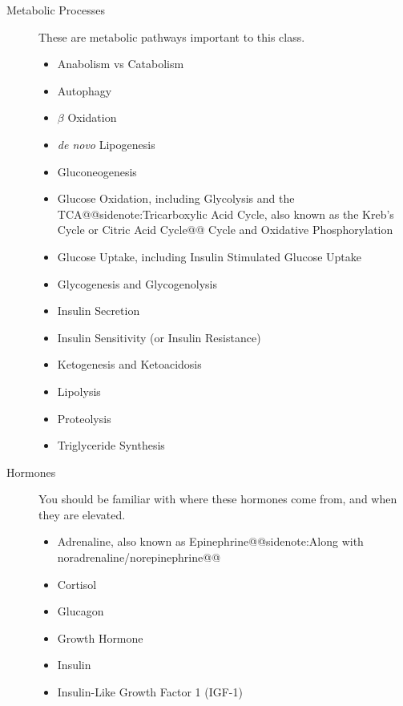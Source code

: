 \documentclass{tufte-handout}
\makeatletter
\def\sidenote#1{@@sidenote:#1@@}
\makeatother
\begin{document}
\begin{description}
	\item [Metabolic Processes]  These are metabolic pathways important to this class.
	\begin{itemize}
		\item Anabolism vs Catabolism
		\item Autophagy
		\item $\beta$ Oxidation
		\item \textit{de novo} Lipogenesis
		\item Gluconeogenesis
		\item Glucose Oxidation, including Glycolysis and the TCA\sidenote{Tricarboxylic Acid Cycle, also known as the Kreb's Cycle or Citric Acid Cycle} Cycle and Oxidative Phosphorylation
		\item Glucose Uptake, including Insulin Stimulated Glucose Uptake
		\item Glycogenesis and Glycogenolysis
		\item Insulin Secretion
		\item Insulin Sensitivity (or Insulin Resistance)
		\item Ketogenesis and Ketoacidosis
		\item Lipolysis
		\item Proteolysis
		\item Triglyceride Synthesis
\end{itemize}

	\item[Hormones] You should be familiar with where these hormones come from, and when they are elevated.
	\begin{itemize}
		\item Adrenaline, also known as Epinephrine\sidenote{Along with noradrenaline/norepinephrine}
		\item Cortisol
		\item Glucagon
		\item Growth Hormone
		\item Insulin
		\item Insulin-Like Growth Factor 1 (IGF-1)
	\end{itemize}


\end{description}
\end{document}
